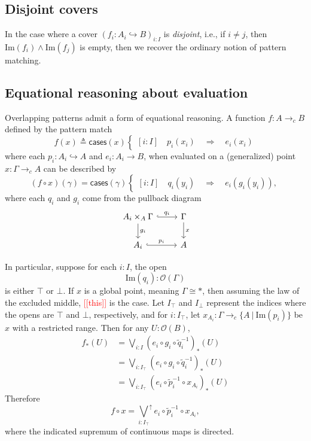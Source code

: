 \documentclass[conference]{IEEEtran}
\newcommand{\hookto}{\hookrightarrow}
\newcommand{\cto}{\to_c}
\newcommand{\suchthat}{\ |\ }
\newcommand{\One}{\ast}
\newcommand{\Open}[1]{\mathcal{O}({#1})}
\newcommand{\Img}[1]{\text{Im}\left({#1}\right)}
\newcommand{\Branch}{\Rightarrow}
\newcommand{\note}[1]{\textcolor{red}{[[{#1}]]}}
\newcommand{\dirsup}[1]{{\bigvee_{#1}}^{\uparrow}}
\begin{document}
\subsection{Disjoint covers}

In the case where a cover $\left( f_i : A_i \hookto B \right)_{i : I}$ is \emph{disjoint}, i.e., if $i \ne j$, then $\Img{f_i} \wedge \Img{f_j}$ is empty, then we recover the ordinary notion of pattern matching.

\subsection{Equational reasoning about evaluation}

Overlapping patterns admit a form of equational reasoning. A function $f : A \cto B$ defined by the pattern match
\[
f(x) \triangleq \mathsf{cases}(x)
\begin{cases}
[i : I] \quad p_i(x_i) \quad \Branch \quad e_i(x_i)
\end{cases}
\]
where each $p_i : A_i \hookto A$ and $e_i : A_i \to B$,
when evaluated on a (generalized) point $x : \Gamma \cto A$
can be described by
\[
(f \circ x)(\gamma) = \mathsf{cases}(\gamma)
\begin{cases}
[i : I] \quad q_i(y_i) \quad \Branch \quad e_i(g_i(y_i)),
\end{cases}
\]
where each $q_i$ and $g_i$ come from the pullback diagram
\begin{equation*}
\begin{tikzcd}
A_i \times_A \Gamma \arrow[r, hook, "q_i"]
   \arrow[d, "g_i"]
& \Gamma \arrow[d, "x"]
\\ A_i \arrow[r, hook, "p_i"]
& A
\end{tikzcd}
\end{equation*}

In particular, suppose for each $i : I$, the open
\[
\Img{q_i} : \Open{\Gamma}
\]
is either $\top$ or $\bot$. If $x$ is a global point, meaning $\Gamma \cong \One$, then assuming the law of the excluded middle, \note{this} is the case. Let $I_\top$ and $I_\bot$ represent the indices where the opens are $\top$ and $\bot$, respectively, and for $i : I_\top$, let $x_{A_i} : \Gamma \cto \{ A \suchthat \Img{p_i} \}$ be $x$ with a restricted range. Then for any $U : \Open{B}$,
\begin{align*}
f_*(U) &= \bigvee_{i : I} (e_i \circ g_i \circ \tilde{q}_i^{-1})_*(U)
\\ &= \bigvee_{i : I_\top} (e_i \circ g_i \circ \tilde{q}_i^{-1})_*(U)
\\ &= \bigvee_{i : I_\top} (e_i \circ \tilde{p}_i^{-1} \circ x_{A_i})_*(U)
\end{align*}
Therefore
\[
f \circ x = \dirsup{i : I_\top} e_i \circ \tilde{p}_i^{-1} \circ x_{A_i},
\]
where the indicated supremum of continuous maps is directed.
\end{document}
